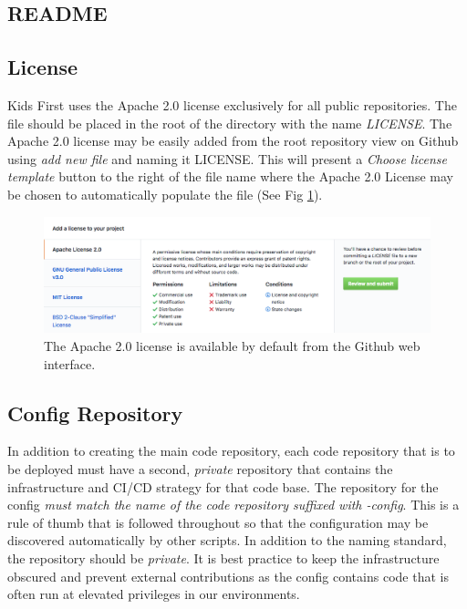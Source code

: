 \documentclass[a4paper,12pt,titlepage]{scrartcl}
\begin{document}
	\subsection{README} \label{readme}
	
	\subsection{License}
	
	Kids First uses the Apache 2.0 \cite{apache2} license exclusively for all public repositories.
	The file should be placed in the root of the directory with the name {\em LICENSE}.
	The Apache 2.0 license may be easily added from the root repository view on Github using {\em add new file} and naming it LICENSE.
	This will present a {\em Choose license template} button to the right of the file name where the Apache 2.0 License may be chosen to automatically populate the file (See Fig \ref{fig:addlicense}).
	
	\begin{figure}[t]
    		\centering
    		\includegraphics[width=0.8\linewidth]{images/license.png}
    		\caption{The Apache 2.0 license is available by default from the Github web interface.}
    		\label{fig:addlicense}
    \end{figure}
	
	\subsection{Config Repository}
	
	In addition to creating the main code repository, each code repository that is to be deployed must have a second, {\em private} repository that contains the infrastructure and CI/CD strategy for that code base.
	The repository for the config {\em must match the name of the code repository suffixed with -config}.
	This is a rule of thumb that is followed throughout so that the configuration may be discovered automatically by other scripts.
	In addition to the naming standard, the repository should be {\em private}.
	It is best practice to keep the infrastructure obscured and prevent external contributions as the config contains code that is often run at elevated privileges in our environments.
	
\end{document}
